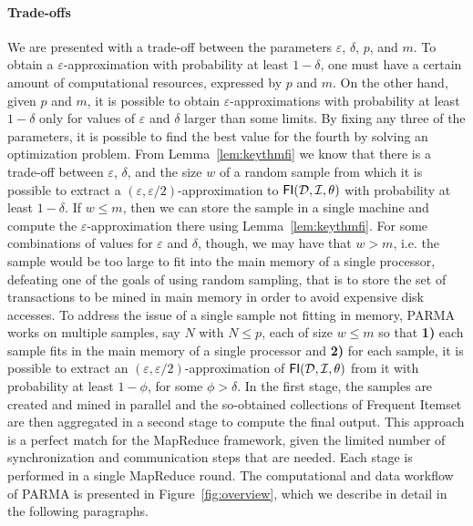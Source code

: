 \paragraph*{Trade-offs} We are presented with a trade-off between the parameters
$\varepsilon$, $\delta$, $p$, and $m$. To obtain a $\varepsilon$-approximation
with probability at least $1-\delta$, one must have a certain amount of computational resources,
expressed by $p$ and $m$. On the other hand, given $p$ and $m$, it is possible
to obtain $\varepsilon$-approximations with probability at least
$1-\delta$ only for values of $\varepsilon$ and $\delta$ larger than some
limits. By fixing any three of the parameters, it is possible to find the
best value for the fourth by solving an optimization problem. From
Lemma~\ref{lem:keythmfi} we know that there is a trade-off between
$\varepsilon$, $\delta$, and the size $w$ of a random sample from which it is
possible to extract a $(\varepsilon,\varepsilon/2)$-approximation to
$\mathsf{FI}({\cal D},{\cal I},\theta)$ with probability at least $1-\delta$. If $w\le m$, then
we can store the sample in a single machine and compute the
$\varepsilon$-approximation there using Lemma~\ref{lem:keythmfi}. For some
combinations of values for $\varepsilon$ and $\delta$, though, we may have that
$w>m$, i.e. the sample would be too large to fit into the main memory of a single
processor, defeating one of the goals of using random sampling, that is to store
the set of transactions to be mined in main memory in order to avoid expensive disk
accesses. To address the issue of a single sample not fitting in memory, PARMA
works on multiple samples, say $N$ with $N\le p$, each of size $w\le m$ so that
{\bf 1)} each sample fits in the main memory of a single processor and {\bf 2)}
for each sample, it is possible to extract an
$(\varepsilon,\varepsilon/2)$-approximation of $\mathsf{FI}({\cal D},{\cal I},\theta)$ from it
with probability at least $1-\phi$, for some $\phi>\delta$. In the first stage,
the samples are created and mined in parallel and the so-obtained collections of
Frequent Itemset are then aggregated in a second stage to compute the final output. This
approach is a perfect match for the MapReduce framework, given the limited
number of synchronization and
communication steps that are needed. Each
stage is performed in a single MapReduce round. The computational and data
workflow of PARMA is presented in Figure~\ref{fig:overview}, which we
describe in detail in the following paragraphs.

